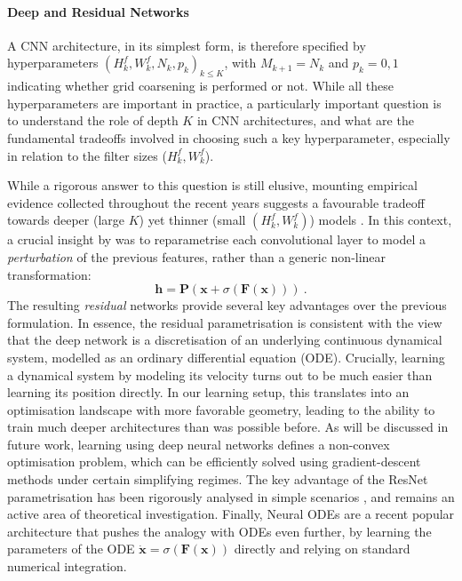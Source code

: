 \paragraph{Deep and Residual Networks}
A CNN architecture, in its simplest form, is therefore specified by hyperparameters $(H^f_k, W^f_k, N_k, p_k )_{k \leq K}$, with $M_{k+1} = N_k$ and $p_k=0,1$ indicating whether grid coarsening is performed or not. While all these hyperparameters are important in practice, a particularly important  question is to understand the role of depth $K$ in CNN architectures, and what are the fundamental tradeoffs involved in choosing such a key hyperparameter, especially in relation to the filter sizes ($H_k^f, W_k^f$). 

While a rigorous answer to this question is still elusive, mounting empirical evidence collected throughout the recent years suggests a favourable tradeoff towards deeper (large $K$) yet thinner (small $(H^f_k, W^f_k)$) models . In this context, a crucial insight by \cite{he2016deep} was to reparametrise each convolutional layer to model a \emph{perturbation} of the previous features, rather than a generic non-linear transformation:
\begin{equation}
    \mathbf{h} = \mathbf{P}\left(\mathbf{x} + \sigma(\mathbf{F}(\mathbf{x})) \right)~.
\end{equation}
The resulting \emph{residual} networks provide several key advantages over the previous formulation. In essence, the residual parametrisation is consistent with the view that the deep network is a discretisation of an underlying continuous dynamical system, modelled as an ordinary differential equation (ODE). Crucially, learning a dynamical system by modeling its velocity turns out to be much easier than learning its position directly. In our learning setup, this translates into an optimisation landscape with more favorable geometry, leading to the ability to train much deeper architectures than was possible before. As will be discussed in future work, learning using deep neural networks defines a non-convex optimisation problem, which can be efficiently solved using gradient-descent methods under certain simplifying regimes. The key advantage of the ResNet parametrisation has been rigorously analysed in simple scenarios \citep{hardt2016identity}, and remains an active area of theoretical investigation. 
Finally, Neural ODEs \citep{chen2018neural} are a recent popular architecture that pushes the analogy with ODEs even further, by learning the parameters of the ODE $\dot{\mathbf{x}} = \sigma( \mathbf{F}(\mathbf{x}))$ directly and relying on standard numerical integration. 

